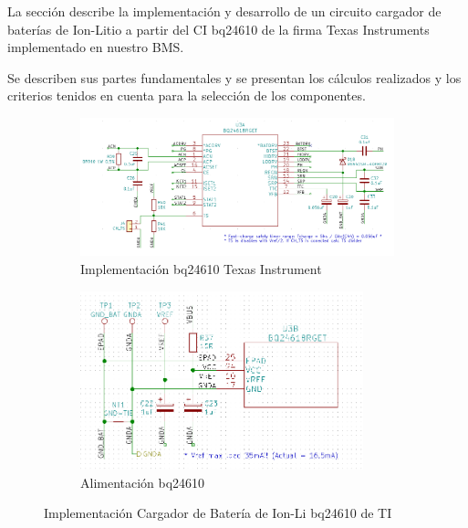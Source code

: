 \documentclass[10pt, a4paper]{article}
\begin{document}
La sección describe la implementación y desarrollo de un circuito cargador de
baterías de Ion-Litio a partir del \acrfull{CI} bq24610 de la firma Texas
Instruments implementado en nuestro \acrshort{BMS}.

Se describen sus partes fundamentales y se presentan los cálculos realizados y
los criterios tenidos en cuenta para la selección de los componentes. 

\begin{figure}[h!]
    \centering
    \begin{subfigure}[t]{0.6\textwidth}
        \centering
        \includegraphics[width=1.1\textwidth]{hardware/bat_charger/bc_ic.png}
        \caption{Implementación bq24610 Texas Instrument}
        \label{fig:bc_ic_ti}
    \end{subfigure}
    \hfill
    \begin{subfigure}[t]{0.35\textwidth}
        \centering
        \includegraphics[width=0.9\textwidth]{hardware/bat_charger/bc_ic_power_supply.png}
        \caption{Alimentación bq24610}
        \label{fig:bc_ic_power_supply}
    \end{subfigure}
    \caption{Implementación Cargador de Batería de Ion-Li bq24610 de TI}
    \label{fig:bc_ic}
\end{figure}
\FloatBarrier
\end{document}
